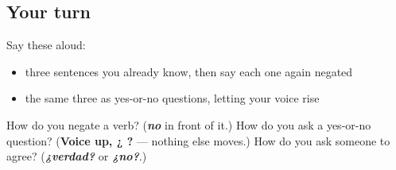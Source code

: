 \subsection*{Your turn}
Say these aloud:

\begin{itemize}
\raggedright
  \item three sentences you already know, then say each one again negated
  \item the same three as yes-or-no questions, letting your voice rise
\end{itemize}

\begin{tcolorbox}[breakable,colback=teal!4,colframe=teal!35!black,title={Before you move on}]
How do you negate a verb? (\emph{\textbf{no}} in front of it.) How do you ask a yes-or-no question? (\textbf{Voice up, ¿ ?} — nothing else moves.) How do you ask someone to agree? (\emph{\textbf{¿verdad?}} or \emph{\textbf{¿no?}}.)
\end{tcolorbox}
